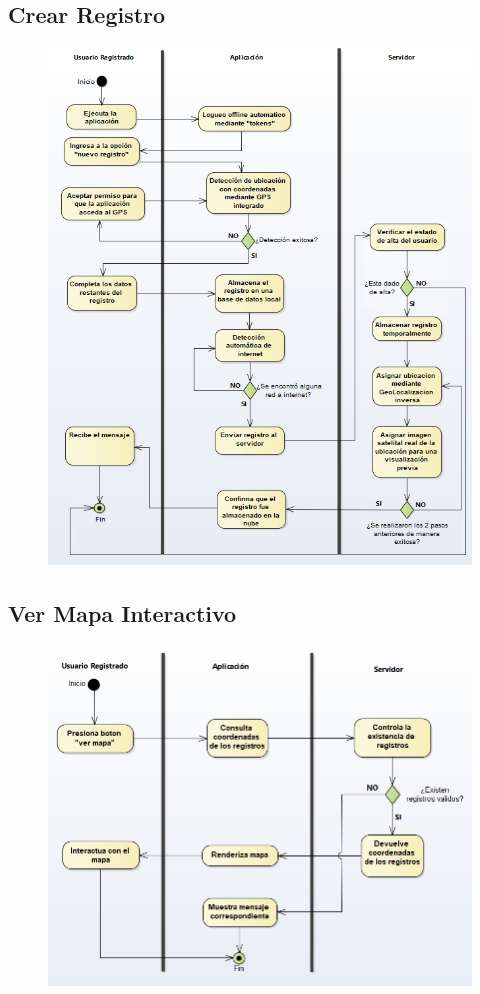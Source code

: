 \subsection{Crear Registro }

\begin{figure}[H]
  \centering
    \includegraphics{imagenes/analisis/diagrama-actividad-crear-registro.png}
    \label{fig:diagrama-actividad-crear-tienda}
\end{figure}

\subsection{Ver Mapa Interactivo}

\begin{figure}[H]
  \centering
    \includegraphics[width=1\textwidth]{imagenes/analisis/diagrama-actividad-ver-mapa.png}
    \label{fig:diagrama-actividad-comprar-producto}
\end{figure}